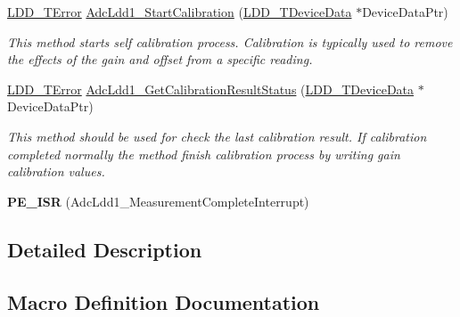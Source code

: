 \begin{DoxyCompactItemize}
\hyperlink{group___p_e___types__module_ga24c2b045fd04e79e85f261ce4df35588}{L\+D\+D\+\_\+\+T\+Error} \hyperlink{group___adc_ldd1__module_gab9d49b5f1a7ef34cde56046754ebb62a}{Adc\+Ldd1\+\_\+\+Start\+Calibration} (\hyperlink{group___p_e___types__module_gac5cf1362f1f0e3a2ce71b1bf2276d091}{L\+D\+D\+\_\+\+T\+Device\+Data} $\ast$Device\+Data\+Ptr)
\begin{DoxyCompactList}\small\item\em This method starts self calibration process. Calibration is typically used to remove the effects of the gain and offset from a specific reading. \end{DoxyCompactList}\item 
\hyperlink{group___p_e___types__module_ga24c2b045fd04e79e85f261ce4df35588}{L\+D\+D\+\_\+\+T\+Error} \hyperlink{group___adc_ldd1__module_gaeec76afa5d4906636d7b7acd8a4008d3}{Adc\+Ldd1\+\_\+\+Get\+Calibration\+Result\+Status} (\hyperlink{group___p_e___types__module_gac5cf1362f1f0e3a2ce71b1bf2276d091}{L\+D\+D\+\_\+\+T\+Device\+Data} $\ast$Device\+Data\+Ptr)
\begin{DoxyCompactList}\small\item\em This method should be used for check the last calibration result. If calibration completed normally the method finish calibration process by writing gain calibration values. \end{DoxyCompactList}\item 
\mbox{\label{group___adc_ldd1__module_ga563031e4594799f73a2a64dbdc65ea00}} 
{\bfseries P\+E\+\_\+\+I\+SR} (Adc\+Ldd1\+\_\+\+Measurement\+Complete\+Interrupt)
\end{DoxyCompactItemize}


\subsection{Detailed Description}


\subsection{Macro Definition Documentation}
\mbox{\label{group___adc_ldd1__module_gae667536b042ed10bbf59a6ab655e2520}} 
